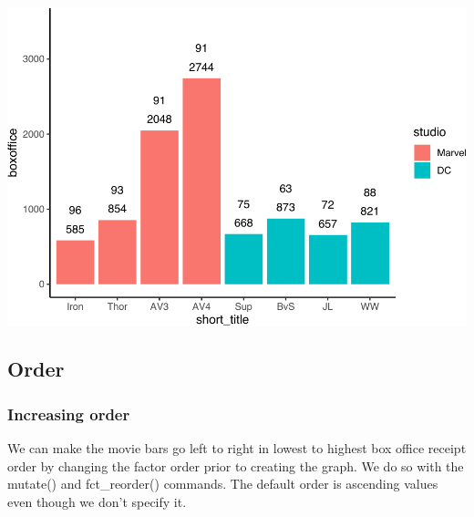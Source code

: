 \documentclass[
]{krantz}
\makeatletter
\newenvironment{Shaded}{\begin{snugshade}}{\end{snugshade}}
\newcommand{\DataTypeTok}[1]{\textcolor[rgb]{0.27,0.27,0.27}{#1}}
\newcommand{\KeywordTok}[1]{\textcolor[rgb]{0.27,0.27,0.27}{\textbf{#1}}}
\newcommand{\NormalTok}[1]{#1}
\newcommand{\OperatorTok}[1]{\textcolor[rgb]{0.43,0.43,0.43}{\textbf{#1}}}
\newcommand{\StringTok}[1]{\textcolor[rgb]{0.5,0.5,0.5}{#1}}
\newenvironment{kframe}{%
\medskip{}
\setlength{\fboxsep}{.8em}
 \def\at@end@of@kframe{}%
 \ifinner\ifhmode%
  \def\at@end@of@kframe{\end{minipage}}%
  \begin{minipage}{\columnwidth}%
 \fi\fi%
 \def\FrameCommand##1{\hskip\@totalleftmargin \hskip-\fboxsep
 \colorbox{shadecolor}{##1}\hskip-\fboxsep
     \hskip-\linewidth \hskip-\@totalleftmargin \hskip\columnwidth}%
 \MakeFramed {\advance\hsize-\width
   \@totalleftmargin\z@ \linewidth\hsize
   \@setminipage}}%
 {\par\unskip\endMakeFramed%
 \at@end@of@kframe}
\renewenvironment{Shaded}{\begin{kframe}}{\end{kframe}}
\makeatother
\begin{document}
\includegraphics[width=0.65\linewidth]{bookdown_files/figure-latex/unnamed-chunk-269-1}

\hypertarget{order}{%
\subsection{Order}\label{order}}

\hypertarget{increasing-order}{%
\subsubsection{Increasing order}\label{increasing-order}}

We can make the movie bars go left to right in lowest to highest box office receipt order by changing the factor order prior to creating the graph. We do so with the mutate() and fct\_reorder() commands. The default order is ascending values even though we don't specify it.

\begin{Shaded}
\end{Shaded}
\end{document}
